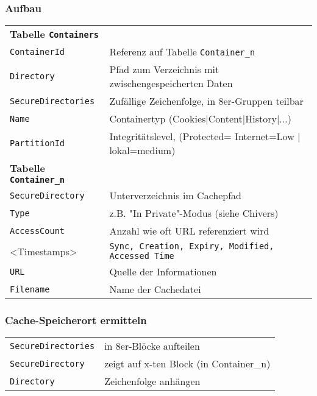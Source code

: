 \begin{multicols}{3}
\subsubsection{Aufbau}
\begin{tabular}{@{}p{\the\MyLen}%
		@{}p{\linewidth-\the\MyLen}@{}}
	\textbf{Tabelle \texttt{Containers}} & \\
	\texttt{ContainerId} & Referenz auf Tabelle \texttt{Container\_n}\\
	\texttt{Directory} & Pfad zum Verzeichnis mit zwischengespeicherten Daten\\
	\texttt{SecureDirectories} & Zufällige Zeichenfolge, in 8er-Gruppen teilbar\\
	\texttt{Name} & Containertyp (Cookies|Content|History|...)\\
	\texttt{PartitionId} & Integritätslevel, (Protected= Internet=Low | lokal=medium)\\
	\textbf{Tabelle \texttt{Container\_n}} & \\
	\texttt{SecureDirectory} & Unterverzeichnis im Cachepfad \\
	\texttt{Type} & z.B. "In Private"-Modus (siehe Chivers)\\
	\texttt{AccessCount} & Anzahl wie oft URL referenziert wird\\
	<Timestamps> & \texttt{Sync, Creation, Expiry, Modified, Accessed Time}\\
	\texttt{URL} & Quelle der Informationen\\
	\texttt{Filename} & Name der Cachedatei\\
\end{tabular}

\subsubsection{Cache-Speicherort ermitteln}
\begin{tabular}{@{}p{\the\MyLen}%
		@{}p{\linewidth-\the\MyLen}@{}}
	\texttt{SecureDirectories} & in 8er-Blöcke aufteilen\\
	\texttt{SecureDirectory} & zeigt auf x-ten Block (in Container\_n)\\
	\texttt{Directory} & Zeichenfolge anhängen\\
\end{tabular}


\end{multicols}
